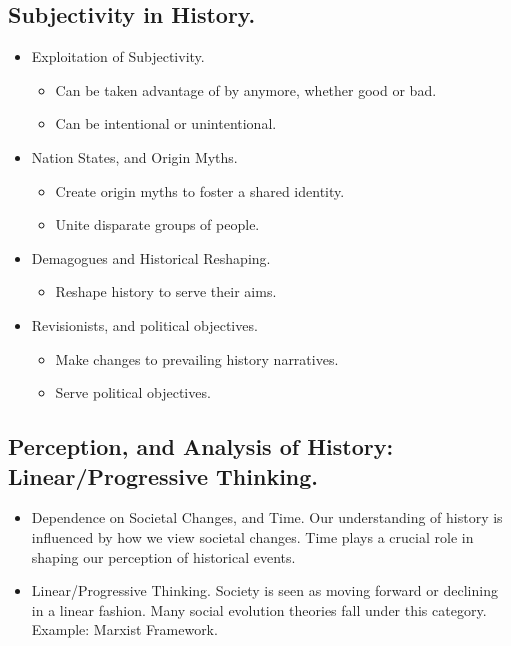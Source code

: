 \documentclass[11pt]{book}
\begin{document}
					\subsection{Subjectivity in History.}
						\begin{itemize}
							\item Exploitation of Subjectivity.

								\begin{itemize}
									\item Can be taken advantage of by anymore, whether good or bad.
									\item Can be intentional or unintentional.
								\end{itemize}
								
							\item Nation States, and Origin Myths.

								\begin{itemize}
									\item Create origin myths to foster a shared identity.
									\item Unite disparate groups of people.

								\end{itemize}

							\item Demagogues and Historical Reshaping.

								\begin{itemize}
									\item Reshape history to serve their aims.
								\end{itemize}
							\item Revisionists, and political objectives.
								\begin{itemize}
									\item Make changes to prevailing history narratives.
									\item Serve political objectives.
								\end{itemize}
						\end{itemize}						
						
						
					\subsection{Perception, and Analysis of History: Linear/Progressive Thinking.}
						\begin{itemize}
							\item Dependence on Societal Changes, and Time.
								\subitem Our understanding of history is influenced by how we view societal changes.
								\subitem Time plays a crucial role in shaping our perception of historical events.
							\item Linear/Progressive Thinking.
								\subitem Society is seen as moving forward or declining in a linear fashion.
								\subitem Many social evolution theories fall under this category.
								\subitem Example: Marxist Framework.
						\end{itemize}
\end{document}
